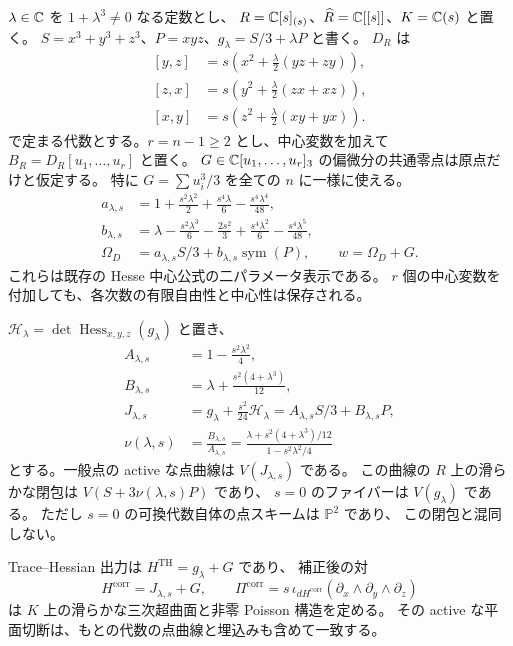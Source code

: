 $\lambda\in\mathbb C$ を $1+\lambda^3\ne0$ なる定数とし、
$R=\mathbb C[s]_{(s)}$、$\widehat R=\mathbb C[[s]]$、$K=\mathbb C(s)$ と置く。
$S=x^3+y^3+z^3$、$P=xyz$、$g_\lambda=S/3+\lambda P$ と書く。
$D_R$ は
\[
 \begin{aligned}
 [y,z]&=s\left(x^2+\frac\lambda2(yz+zy)\right),\\
 [z,x]&=s\left(y^2+\frac\lambda2(zx+xz)\right),\\
 [x,y]&=s\left(z^2+\frac\lambda2(xy+yx)\right).
 \end{aligned}
\]
で定まる代数とする。$r=n-1\ge2$ とし、中心変数を加えて
$B_R=D_R[u_1,\ldots,u_r]$ と置く。
$G\in\mathbb C[u_1,\ldots,u_r]_3$ の偏微分の共通零点は原点だけと仮定する。
特に $G=\sum u_i^3/3$ を全ての $n$ に一様に使える。
\[
 \begin{aligned}
 a_{\lambda,s}&=1+\frac{s^2\lambda^2}{2}
                       +\frac{s^4\lambda}{6}-\frac{s^4\lambda^4}{48},\\
 b_{\lambda,s}&=\lambda-\frac{s^2\lambda^3}{6}-\frac{2s^2}{3}
                       +\frac{s^4\lambda^2}{6}-\frac{s^4\lambda^5}{48},\\
 \Omega_D&=a_{\lambda,s}S/3+b_{\lambda,s}\operatorname{sym}(P),
 \qquad w=\Omega_D+G.
 \end{aligned}
\]
これらは既存の Hesse 中心公式の二パラメータ表示である。
$r$ 個の中心変数を付加しても、各次数の有限自由性と中心性は保存される。

\begin{proposition}
\label{prop:nfm-hesse-point-correction}
$\mathscr H_\lambda=\det\operatorname{Hess}_{x,y,z}(g_\lambda)$ と置き、
\[
 \begin{aligned}
 A_{\lambda,s}&=1-\frac{s^2\lambda^2}{4},\\
 B_{\lambda,s}&=\lambda+\frac{s^2(4+\lambda^3)}{12},\\
 J_{\lambda,s}&=g_\lambda+\frac{s^2}{24}\mathscr H_\lambda
       =A_{\lambda,s}S/3+B_{\lambda,s}P,\\
 \nu(\lambda,s)&=\frac{B_{\lambda,s}}{A_{\lambda,s}}
       =\frac{\lambda+s^2(4+\lambda^3)/12}{1-s^2\lambda^2/4}
 \end{aligned}
\]
とする。一般点の active な点曲線は $V(J_{\lambda,s})$ である。
この曲線の $R$ 上の滑らかな閉包は $V(S+3\nu(\lambda,s)P)$ であり、
$s=0$ のファイバーは $V(g_\lambda)$ である。
ただし $s=0$ の可換代数自体の点スキームは $\mathbb P^2$ であり、
この閉包と混同しない。

Trace--Hessian 出力は $H^{\mathrm{TH}}=g_\lambda+G$ であり、
補正後の対
\[
 H^{\mathrm{corr}}=J_{\lambda,s}+G,
 \qquad
 \Pi^{\mathrm{corr}}
 =s\,\iota_{dH^{\mathrm{corr}}}
       (\partial_x\wedge\partial_y\wedge\partial_z)
\]
は $K$ 上の滑らかな三次超曲面と非零 Poisson 構造を定める。
その active な平面切断は、もとの代数の点曲線と埋込みも含めて一致する。
\end{proposition}

